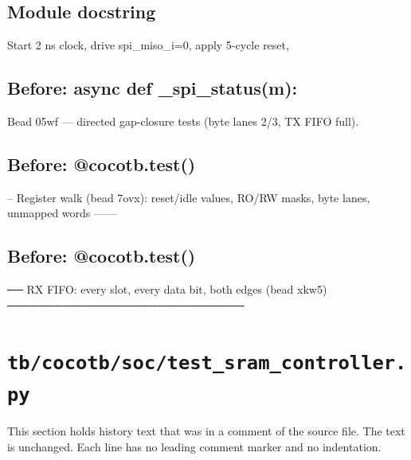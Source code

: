 \begin{record}

\subsection*{Module docstring}

\begin{textblock}
Start 2 ns clock, drive spi_miso_i=0, apply 5-cycle reset,
\end{textblock}

\subsection*{Before: async def \_spi\_status(m):}

\begin{textblock}
Bead 05wf — directed gap-closure tests (byte lanes 2/3, TX FIFO full).
\end{textblock}

\subsection*{Before: @cocotb.test()}

\begin{textblock}
-- Register walk (bead 7ovx): reset/idle values, RO/RW masks, byte lanes, unmapped words ------
\end{textblock}

\subsection*{Before: @cocotb.test()}

\begin{textblock}
── RX FIFO: every slot, every data bit, both edges (bead xkw5) ──────────────────────────────
\end{textblock}

\end{record}

\section{\texttt{tb/cocotb/soc/test\_sram\_controller.py}}\label{cr:suite:soc-test-sram-controller}

This section holds history text that was in a comment of the source file. The text is unchanged. Each line has no leading comment marker and no indentation.

